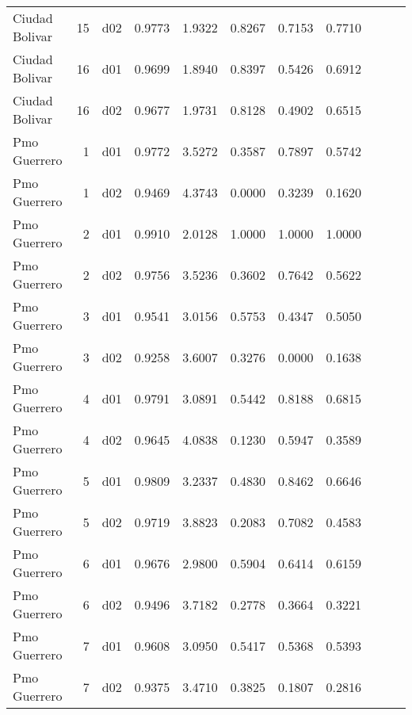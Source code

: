 \begin{landscape}
\begin{longtable}{p{2cm}rrrrrrrrrr}
       Ciudad Bolivar  &         15 &     d02 &   0.9773 &  1.9322 &        0.8267 &           0.7153 &  0.7710 \\
       Ciudad Bolivar  &         16 &     d01 &   0.9699 &  1.8940 &        0.8397 &           0.5426 &  0.6912 \\
       Ciudad Bolivar  &         16 &     d02 &   0.9677 &  1.9731 &        0.8128 &           0.4902 &  0.6515 \\
         Pmo Guerrero  &          1 &     d01 &   0.9772 &  3.5272 &        0.3587 &           0.7897 &  0.5742 \\
         Pmo Guerrero  &          1 &     d02 &   0.9469 &  4.3743 &        0.0000 &           0.3239 &  0.1620 \\
         Pmo Guerrero  &          2 &     d01 &   0.9910 &  2.0128 &        1.0000 &           1.0000 &  1.0000 \\
         Pmo Guerrero  &          2 &     d02 &   0.9756 &  3.5236 &        0.3602 &           0.7642 &  0.5622 \\
         Pmo Guerrero  &          3 &     d01 &   0.9541 &  3.0156 &        0.5753 &           0.4347 &  0.5050 \\
         Pmo Guerrero  &          3 &     d02 &   0.9258 &  3.6007 &        0.3276 &           0.0000 &  0.1638 \\
         Pmo Guerrero  &          4 &     d01 &   0.9791 &  3.0891 &        0.5442 &           0.8188 &  0.6815 \\
         Pmo Guerrero  &          4 &     d02 &   0.9645 &  4.0838 &        0.1230 &           0.5947 &  0.3589 \\
         Pmo Guerrero  &          5 &     d01 &   0.9809 &  3.2337 &        0.4830 &           0.8462 &  0.6646 \\
         Pmo Guerrero  &          5 &     d02 &   0.9719 &  3.8823 &        0.2083 &           0.7082 &  0.4583 \\
         Pmo Guerrero  &          6 &     d01 &   0.9676 &  2.9800 &        0.5904 &           0.6414 &  0.6159 \\
         Pmo Guerrero  &          6 &     d02 &   0.9496 &  3.7182 &        0.2778 &           0.3664 &  0.3221 \\
         Pmo Guerrero  &          7 &     d01 &   0.9608 &  3.0950 &        0.5417 &           0.5368 &  0.5393 \\
         Pmo Guerrero  &          7 &     d02 &   0.9375 &  3.4710 &        0.3825 &           0.1807 &  0.2816 \\

\end{longtable}
\end{landscape}
